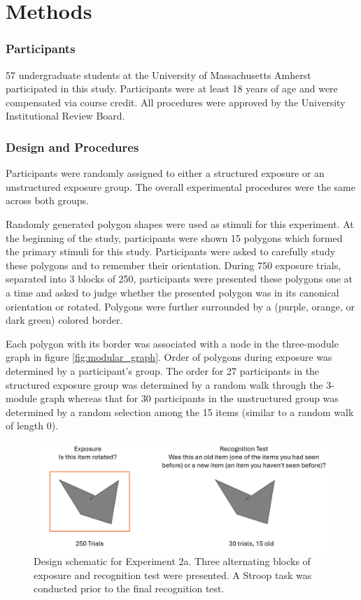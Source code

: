 \section{Methods}
\subsubsection*{Participants}
57 undergraduate students at the University of Massachusetts Amherst participated in this study. Participants were at least 18 years of age and were compensated via course credit. All procedures were approved by the University Institutional Review Board. 

\subsubsection*{Design and Procedures}
Participants were randomly assigned to either a structured exposure or an unstructured exposure group. The overall experimental procedures were the same across both groups. 

Randomly generated polygon shapes were used as stimuli for this experiment. At the beginning of the study, participants were shown 15 polygons which formed the primary stimuli for this study. Participants were asked to carefully study these polygons and to remember their orientation. During 750 exposure trials, separated into 3 blocks of 250, participants were presented these polygons one at a time and asked to judge whether the presented polygon was in its canonical orientation or rotated. Polygons were further surrounded by a (purple, orange, or dark green) colored border.

Each polygon with its border was associated with a node in the three-module graph in figure \ref{fig:modular_graph}. Order of polygons during exposure was determined by a participant's group. The order for 27 participants in the structured exposure group was determined by a random walk through the 3-module graph whereas that for 30 participants in the unstructured group was determined by a random selection among the 15 items (similar to a random walk of length 0). 

\begin{figure}[ht]
    \centering
    \label{fig:exp2-design}
    \includegraphics[width = \textwidth]{chapter_notebooks/chapter_3/figures/exp2_design.png}
    \caption{Design schematic for Experiment 2a. Three alternating blocks of exposure and recognition test were presented. A Stroop task was conducted prior to the final recognition test.}
\end{figure}

